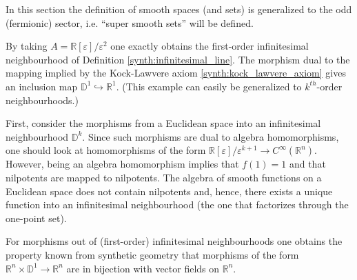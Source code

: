     In this section the definition of smooth spaces (and sets) is generalized to the odd (fermionic) sector, i.e. ``super smooth sets'' will be defined.
    \begin{example}
        By taking $A=\mathbb{R}[\varepsilon]/\varepsilon^2$ one exactly obtains the first-order infinitesimal neighbourhood of Definition \ref{synth:infinitesimal_line}. The morphism dual to the mapping implied by the Kock-Lawvere axiom \ref{synth:kock_lawvere_axiom} gives an inclusion map $\mathbb{D}^1\hookrightarrow\mathbb{R}^1$. (This example can easily be generalized to $k^{th}$-order neighbourhoods.)
    \end{example}

    \begin{property}[Morphisms]
        First, consider the morphisms from a Euclidean space into an infinitesimal neighbourhood $\mathbb{D}^k$. Since such morphisms are dual to algebra homomorphisms, one should look at homomorphisms of the form $\mathbb{R}[\varepsilon]/\varepsilon^{k+1}\rightarrow C^\infty(\mathbb{R}^n)$. However, being an algebra homomorphism implies that $f(1)=1$ and that nilpotents are mapped to nilpotents. The algebra of smooth functions on a Euclidean space does not contain nilpotents and, hence, there exists a unique function into an infinitesimal neighbourhood (the one that factorizes through the one-point set).

        For morphisms out of (first-order) infinitesimal neighbourhoods one obtains the property known from synthetic geometry that morphisms of the form $\mathbb{R}^n\times\mathbb{D}^1\rightarrow\mathbb{R}^n$ are in bijection with vector fields on $\mathbb{R}^n$.
    \end{property}

